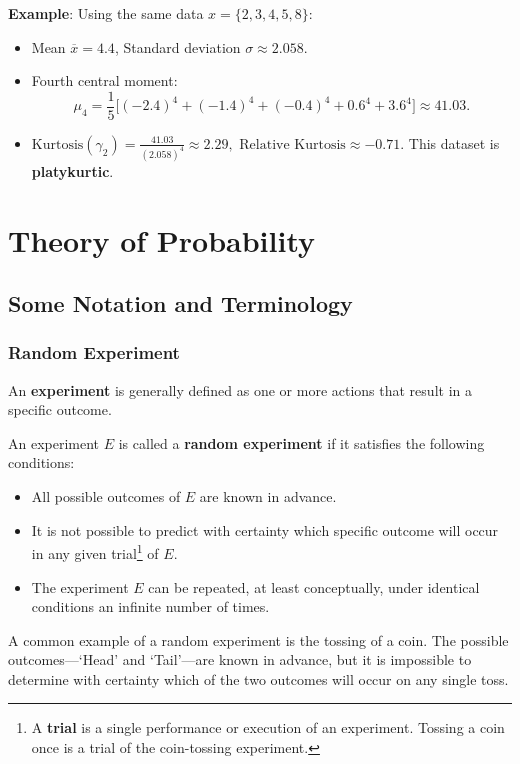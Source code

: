 \documentclass[twoside]{book}
\begin{document}
\textbf{Example}: Using the same data \(x = \{2,3,4,5,8\}\):
\begin{itemize}
  \item Mean \(\overline{x}=4.4\), \quad Standard deviation \(\sigma\approx2.058\).
  \item Fourth central moment:
    \[
    \mu_4 = \frac{1}{5}\bigl[(-2.4)^4 + (-1.4)^4 + (-0.4)^4 + 0.6^4 + 3.6^4\bigr]
           \approx 41.03.
    \]
  \item \(\displaystyle \text{Kurtosis} (\gamma_2) = \frac{41.03}{(2.058)^4}\approx 2.29,\)
        \(\text{Relative Kurtosis}\approx -0.71\).
        This dataset is \textbf{platykurtic}.
\end{itemize}


\chapter{Theory of Probability}
\section{Some Notation and Terminology}
\subsection{Random Experiment}

An \textbf{experiment} is generally defined as one or more actions that result in a specific outcome.

\begin{textbox}
An experiment $E$ is called a \textbf{random experiment} if it satisfies the following conditions:

\begin{itemize}
    \item All possible outcomes of $E$ are known in advance.
    \item It is not possible to predict with certainty which specific outcome will occur in any given trial\footnote{A \textbf{trial} is a single performance or execution of an experiment. Tossing a coin once is a trial of the coin-tossing experiment.} of $E$.
    \item The experiment $E$ can be repeated, at least conceptually, under identical conditions an infinite number of times.
\end{itemize}
\end{textbox}

A common example of a random experiment is the tossing of a coin. The possible outcomes—`Head' and `Tail'—are known in advance, but it is impossible to determine with certainty which of the two outcomes will occur on any single toss.
\end{document}
